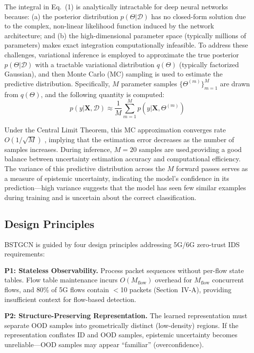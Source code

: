 \documentclass[lettersize,journal]{IEEEtran}
\begin{document}
The integral in Eq.~(1) is analytically intractable for deep neural networks because: (a) the posterior distribution $p(\Theta|\mathcal{D})$ has no closed-form solution due to the complex, non-linear likelihood function induced by the network architecture; and (b) the high-dimensional parameter space (typically millions of parameters) makes exact integration computationally infeasible. To address these challenges, variational inference is employed to approximate the true posterior $p(\Theta|\mathcal{D})$ with a tractable variational distribution $q(\Theta)$ (typically factorized Gaussian), and then Monte Carlo (MC) sampling is used to estimate the predictive distribution. Specifically, $M$ parameter samples $\{\Theta^{(m)}\}_{m=1}^M$ are drawn from $q(\Theta)$, and the following quantity is computed:
\begin{equation}
p(y|\mathbf{X}, \mathcal{D}) \approx \frac{1}{M} \sum_{m=1}^M p(y|\mathbf{X}, \Theta^{(m)})
\end{equation}

Under the Central Limit Theorem, this MC approximation converges rate $O(1/\sqrt{M})$ , implying that the estimation error decreases as the number of samples increases. During inference, $M=20$ samples are used,providing a good balance between uncertainty estimation accuracy and computational efficiency. The variance of this predictive distribution across the $M$ forward passes serves as a measure of epistemic uncertainty, indicating the model's confidence in its prediction---high variance suggests that the model has seen few similar examples during training and is uncertain about the correct classification.

\subsection{Design Principles}
\label{sec:design_principles}

BSTGCN is guided by four design principles addressing 5G/6G zero-trust IDS requirements:

\textbf{P1: Stateless Observability.} Process packet sequences without per-flow state tables. Flow table maintenance incurs $O(M_{\text{flow}})$ overhead for $M_{\text{flow}}$ concurrent flows, and 80\% of 5G flows contain $<$10 packets (Section~IV-A), providing insufficient context for flow-based detection.

\textbf{P2: Structure-Preserving Representation.} The learned representation must separate OOD samples into geometrically distinct (low-density) regions. If the representation conflates ID and OOD samples, epistemic uncertainty becomes unreliable---OOD samples may appear ``familiar'' (overconfidence).
\end{document}
